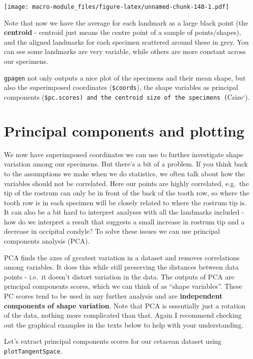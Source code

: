 \documentclass[]{book}
\begin{document}
\texttt{[image: macro-module\_files/figure-latex/unnamed-chunk-148-1.pdf]}

Note that now we have the average for each landmark as a large black
point (the \textbf{centroid} - centroid just means the centre point of a
sample of points/shapes), and the aligned landmarks for each specimen
scattered around these in grey. You can see some landmarks are very
variable, while others are more constant across our specimens.

\texttt{gpagen} not only outputs a nice plot of the specimens and their
mean shape, but also the superimposed coordinates (\texttt{\$coords}),
the shape variables as principal components
(\texttt{\$pc.scores)\ and\ the\ centroid\ size\ of\ the\ specimens\ (}Csize`).

\section{Principal components and
plotting}\label{principal-components-and-plotting}

We now have superimposed coordinates we can use to further investigate
shape variation among our specimens. But there's a bit of a problem. If
you think back to the assumptions we make when we do statistics, we
often talk about how the variables should not be correlated. Here our
points are highly correlated, e.g.~the tip of the rostrum can only be in
front of the back of the tooth row, so where the tooth row is in each
specimen will be closely related to where the rostrum tip is. It can
also be a bit hard to interpret analyses with all the landmarks included
- how do we interpret a result that suggests a small increase in rostrum
tip and a decrease in occipital condyle? To solve these issues we can
use principal components analysis (PCA).

PCA finds the axes of greatest variation in a dataset and removes
correlations among variables. It does this while still preserving the
distances between data points - i.e.~it doesn't distort variation in the
data. The outputs of PCA are principal components scores, which we can
think of as ``shape variables''. These PC scores tend to be used in any
further analysis and are \textbf{independent components of shape
variation}. Note that PCA is essentially just a rotation of the data,
nothing more complicated than that. Again I recommend checking out the
graphical examples in the texts below to help with your understanding.

Let's extract principal components scores for our cetacean dataset using
\texttt{plotTangentSpace}.
\end{document}
